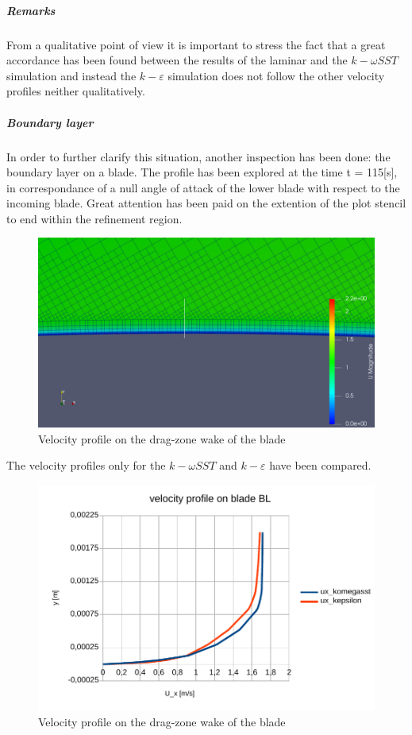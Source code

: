 \documentclass[a4paper,12pt]{article}
\begin{document}
\subparagraph{Remarks}
From a qualitative point of view it is important to stress the fact that a great accordance has been found between the results of the laminar and the $k-\omega SST$ simulation and instead the $k-\varepsilon$ simulation does not follow the other velocity profiles neither qualitatively.

\subparagraph{Boundary layer}
In order to further clarify this situation, another inspection has been done: the boundary layer on a blade.
The profile has been explored at the time t = 115[s], in correspondance of a null angle of attack of the lower blade with respect to the incoming blade.
Great attention has been paid on the extention of the plot stencil to end within the refinement region.


\begin{figure}[H]
\centering
\includegraphics[width=14cm]{images/turbulence/BL_LowerBlade_screenshot.png} 
\caption{Velocity profile on the drag-zone wake of the blade}
\centering
\end{figure}

The velocity profiles only for the $k-\omega SST$ and $k-\varepsilon$ have been compared.

\begin{figure}[H]
\centering
\includegraphics[width=14cm]{images/turbulence/detailBL_kW_Keps.pdf} 
\caption{Velocity profile on the drag-zone wake of the blade}
\centering
\end{figure}
\end{document}
